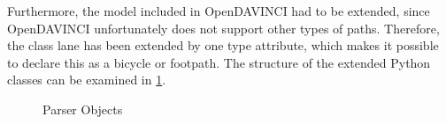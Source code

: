 \documentclass[11pt,oneside,openright]{mpreport}
\begin{document}
Furthermore, the model included in OpenDAVINCI had to be extended, since OpenDAVINCI unfortunately does not support other types of paths.
Therefore, the class lane has been extended by one type attribute, which makes it possible to declare this as a bicycle or footpath.
The structure of the extended Python classes can be examined in \cref{parer_objects}.

\begin{figure}[!ht]
\begin{center}
\caption{Parser Objects}
\label{parer_objects}
\end{center}
\end{figure}


% 
\end{document}
